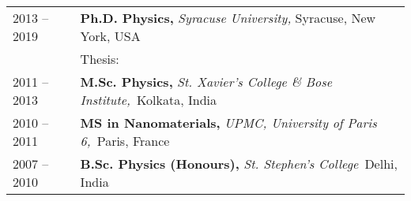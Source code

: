


\begin{longtable}{R{2.5cm}|p{14.8cm}}
 	\textsc{2013 -- 2019} &\textbf{Ph.D. Physics, } \emph{Syracuse University,} Syracuse, New York, USA\\ 
& Thesis:  \\ %
	\textsc{2011 -- 2013} & \textbf{M.Sc. Physics, }\emph{St. Xavier's College \& Bose Institute,}{~Kolkata, }{India} \\
\textsc{2010 -- 2011} &\textbf{MS in Nanomaterials, }\emph{UPMC, University of Paris 6,}{~Paris, }{France} \\
\textsc{2007 -- 2010} & \textbf{B.Sc. Physics (Honours), } \emph{St. Stephen's College}{~Delhi, }{India} \\	
\end{longtable}
